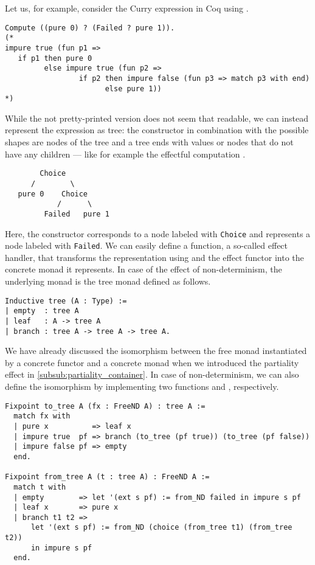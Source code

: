 Let us, for example, consider the Curry expression  in Coq using .

\begin{verbatim}
Compute ((pure 0) ? (Failed ? pure 1)).
(*
impure true (fun p1 =>
   if p1 then pure 0
         else impure true (fun p2 =>
                 if p2 then impure false (fun p3 => match p3 with end)
                       else pure 1))
*)
\end{verbatim}

While the not pretty-printed version does not seem that readable, we can instead represent the expression as tree: the constructor  in combination with the possible shapes are nodes of the tree and a tree ends with  values or nodes that do not have any children --- like for example the effectful computation .

\begin{verbatim}
        Choice
      /        \
   pure 0    Choice
            /      \
         Failed   pure 1
\end{verbatim}

Here, the constructor  corresponds to a node labeled with \texttt{Choice} and  represents a node labeled with \texttt{Failed}.
We can easily define a function, a so-called effect handler, that transforms the representation using  and the effect functor into the concrete monad it represents.
In case of the effect of non-determinism, the underlying monad is the tree monad defined as follows.

\begin{verbatim}
Inductive tree (A : Type) :=
| empty  : tree A
| leaf   : A -> tree A
| branch : tree A -> tree A -> tree A.
\end{verbatim}

We have already discussed the isomorphism between the free monad instantiated by a concrete functor and a concrete monad when we introduced the partiality effect in \autoref{subsub:partiality_container}.
In case of non-determinism, we can also define the isomorphism by implementing two functions  and , respectively.

\begin{verbatim}
Fixpoint to_tree A (fx : FreeND A) : tree A :=
  match fx with
  | pure x          => leaf x
  | impure true  pf => branch (to_tree (pf true)) (to_tree (pf false))
  | impure false pf => empty
  end.

Fixpoint from_tree A (t : tree A) : FreeND A :=
  match t with
  | empty        => let '(ext s pf) := from_ND failed in impure s pf
  | leaf x       => pure x
  | branch t1 t2 =>
      let '(ext s pf) := from_ND (choice (from_tree t1) (from_tree t2))
      in impure s pf
  end.
\end{verbatim}

